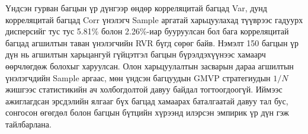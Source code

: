 Үндсэн гурван багцын үр дүнгээр өндөр корреляцитай багцад Var, дунд корреляцитай багцад Corr үнэлэгч Sample аргатай харьцуулахад түүврээс гадуурх дисперсийг тус тус 5.81\% болон 2.26\%-иар бууруулсан бол бага корреляцитай багцад агшилтын таван үнэлэгчийн RVR бүгд сөрөг байв. Нэмэлт 150 багцын үр дүн нь агшилтын харьцангуй гүйцэтгэл багцын бүрэлдэхүүнээс хамаарч өөрчлөгдөж болохыг харуулсан. Олон харьцуулалтын засварын дараа агшилтын үнэлэгчдийн Sample аргаас, мөн үндсэн багцуудын GMVP стратегиудын $1/N$ жишгээс статистикийн ач холбогдолтой давуу байдал тогтоогдоогүй. Иймээс ажиглагдсан эрсдэлийн ялгааг бүх багцад хамаарах баталгаатай давуу тал бус, сонгосон өгөгдөл болон багцын бүтцийн хүрээнд илэрсэн эмпирик үр дүн гэж тайлбарлана.

